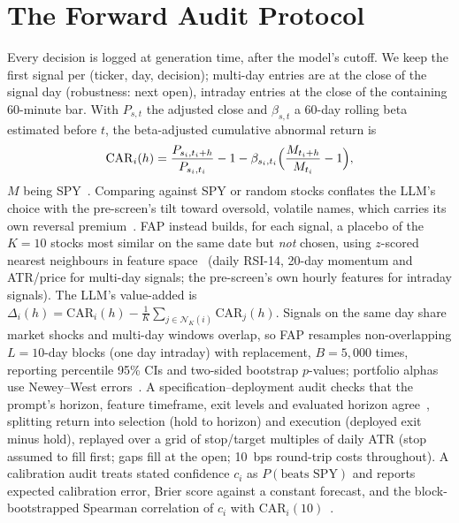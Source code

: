 \documentclass[conference]{IEEEtran}
\begin{document}
\section{The Forward Audit Protocol}
\label{sec:fap}
Every decision is logged at generation time, after the model's cutoff. We keep the first signal per (ticker, day, decision); multi-day entries are at the close of the signal day (robustness: next open), intraday entries at the close of the containing 60-minute bar. With $P_{s,t}$ the adjusted close and $\beta_{s,t}$ a 60-day rolling beta estimated before $t$, the beta-adjusted cumulative abnormal return is
\begin{equation}
\mathrm{CAR}_i(h)=\frac{P_{s_i,t_i+h}}{P_{s_i,t_i}}-1-\beta_{s_i,t_i}\Bigl(\frac{M_{t_i+h}}{M_{t_i}}-1\Bigr),
\end{equation}
$M$ being SPY~\cite{brown1985event}. Comparing against SPY or random stocks conflates the LLM's choice with the pre-screen's tilt toward oversold, volatile names, which carries its own reversal premium~\cite{jegadeesh1990evidence}. FAP instead builds, for each signal, a placebo of the $K{=}10$ stocks most similar on the same date but \emph{not} chosen, using $z$-scored nearest neighbours in feature space~\cite{daniel1997measuring} (daily RSI-14, 20-day momentum and ATR/price for multi-day signals; the pre-screen's own hourly features for intraday signals). The LLM's value-added is $\Delta_i(h)=\mathrm{CAR}_i(h)-\tfrac{1}{K}\sum_{j\in\mathcal{N}_K(i)}\mathrm{CAR}_j(h)$. Signals on the same day share market shocks and multi-day windows overlap, so FAP resamples non-overlapping $L{=}10$-day blocks (one day intraday) with replacement, $B{=}5{,}000$ times, reporting percentile 95\% CIs and two-sided bootstrap $p$-values; portfolio alphas use Newey--West errors~\cite{kunsch1989jackknife,newey1987simple}. A specification--deployment audit checks that the prompt's horizon, feature timeframe, exit levels and evaluated horizon agree~\cite{sculley2015hidden}, splitting return into selection (hold to horizon) and execution (deployed exit minus hold), replayed over a grid of stop/target multiples of daily ATR (stop assumed to fill first; gaps fill at the open; 10~bps round-trip costs throughout). A calibration audit treats stated confidence $c_i$ as $P(\text{beats SPY})$ and reports expected calibration error, Brier score against a constant forecast, and the block-bootstrapped Spearman correlation of $c_i$ with $\mathrm{CAR}_i(10)$~\cite{guo2017calibration}.
\end{document}

